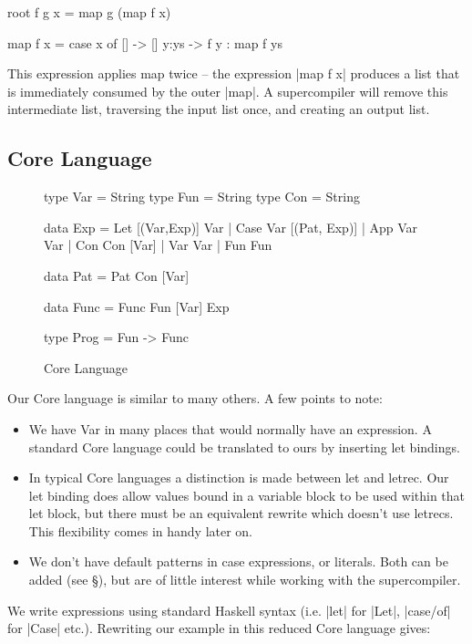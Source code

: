 \documentclass{sigplanconf}
\begin{document}
\begin{code}
root f g x = map g (map f x)

map f x = case x of
    [] -> []
    y:ys -> f y : map f ys
\end{code}

This expression applies map twice -- the expression |map f x| produces a list that is immediately consumed by the outer |map|. A supercompiler will remove this intermediate list, traversing the input list once, and creating an output list.

\subsection{Core Language}
\label{sec:core}

\begin{figure}
\begin{code}
type Var = String
type Fun = String
type Con = String

data Exp = Let [(Var,Exp)] Var
         | Case Var [(Pat, Exp)]
         | App Var Var
         | Con Con [Var]
         | Var Var
         | Fun Fun

data Pat = Pat Con [Var]

data Func = Func Fun [Var] Exp

type Prog = Fun -> Func
\end{code}
\caption{Core Language}
\label{fig:core}
\end{figure}

Our Core language is similar to many others. A few points to note:

\begin{itemize}
\item We have Var in many places that would normally have an expression. A standard Core language could be translated to ours by inserting let bindings.
\item In typical Core languages a distinction is made between let and letrec. Our let binding does allow values bound in a variable block to be used within that let block, but there must be an equivalent rewrite which doesn't use letrecs. This flexibility comes in handy later on.
\item We don't have default patterns in case expressions, or literals. Both can be added (see \S\label{sec:extensions}), but are of little interest while working with the supercompiler.
\end{itemize}

We write expressions using standard Haskell syntax (i.e. |let| for |Let|, |case/of| for |Case| etc.). Rewriting our example in this reduced Core language gives:
\end{document}
